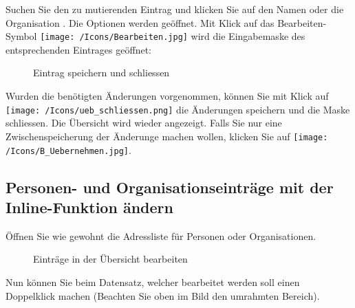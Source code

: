 Suchen Sie den zu mutierenden Eintrag und klicken Sie auf den Namen oder die Organisation . Die Optionen werden geöffnet. Mit Klick auf das Bearbeiten-Symbol \texttt{[image: /Icons/Bearbeiten.jpg]}  wird die Eingabemaske des entsprechenden Eintrages geöffnet:

\begin{figure}[H]
\caption{Eintrag speichern und schliessen}
\end{figure}

Wurden die benötigten Änderungen vorgenommen, können Sie mit Klick auf \texttt{[image: /Icons/ueb\_schliessen.png]}  die Änderungen speichern und die Maske schliessen. Die Übersicht wird wieder angezeigt. Falls Sie nur eine Zwischenspeicherung der Änderunge machen wollen, klicken Sie auf \texttt{[image: /Icons/B\_Uebernehmen.jpg]}.

\subsection{Personen- und Organisationseinträge mit der Inline-Funktion ändern}

Öffnen Sie wie gewohnt die Adressliste für Personen oder Organisationen.

\begin{figure}[H]
\caption{Einträge in der Übersicht bearbeiten}
\end{figure}

Nun können Sie beim Datensatz, welcher bearbeitet werden soll einen Doppelklick machen (Beachten Sie oben im Bild den umrahmten Bereich). 

